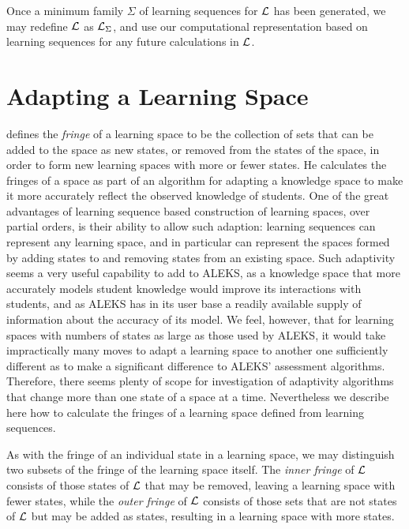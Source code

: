 \documentclass[11pt]{llncs}
\begin{document}
{Once a minimum family $\Sigma$ of learning sequences for $\cal L$ has been generated, we may redefine $\cal L$ as ${\cal L}_\Sigma$, and use our computational representation based on learning sequences for any future calculations in $\cal L$.

\section{Adapting a Learning Space}

\citet{Thi-01} defines the \emph{fringe} of a learning space to be the collection of sets that can be added to the space as new states, or removed from the states of the space, in order to form new learning spaces with more or fewer states. He calculates the fringes of a space as part of an algorithm for adapting a knowledge space to make it more accurately reflect the observed knowledge of students. One of the great advantages of learning sequence based construction of learning spaces, over partial orders, is their ability to allow such adaption: learning sequences can represent any learning space, and in particular can represent the spaces formed by adding states to and removing states from an existing space. Such adaptivity seems a very useful capability to add to ALEKS, as a knowledge space that more accurately models student knowledge would improve its interactions with students, and as ALEKS has in its user base a readily available supply of information about the accuracy of its model. We feel, however, that for learning spaces with numbers of states as large as those used by ALEKS, it would take impractically many moves to adapt a learning space to another one sufficiently different as to make a significant difference to ALEKS' assessment algorithms. Therefore, there seems plenty of scope for investigation of adaptivity algorithms that change more than one state of a space at a time. Nevertheless we describe here how to calculate the fringes of a learning space defined from learning sequences.

As with the fringe of an individual state in a learning space, we may distinguish two subsets of the fringe of the learning space itself.  The \emph{inner fringe} of $\cal L$ consists of those states of $\cal L$ that may be removed, leaving a learning space with fewer states, while the \emph{outer fringe} of $\cal L$ consists of those sets that are not states of $\cal L$ but may be added as states, resulting in a learning space with more states.

}
\end{document}
